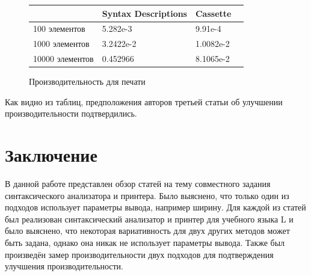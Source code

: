 \documentclass{matmex-diploma-custom}
\begin{document}
\begin{figure}[ht]
\centering
\begin{center}
    \begin{tabular}{ | p{4cm} | p{4cm} | p{3cm} | p{4cm} |}
    \hline
      & Syntax Descriptions &  Cassette \\ \hline
    100 элементов  & 5.282e-3 & 9.91e-4 \\ \hline
    1000 элементов & 3.2422e-2 & 1.0082e-2 \\ \hline
    10000 элементов & 0.452966 & 8.1065e-2 \\
    \hline
    \end{tabular}
\end{center}
\caption{Производительность для печати}
\end{figure}

Как видно из таблиц, предположения авторов третьей статьи об улучшении производительности подтвердились.

\section*{Заключение}
В данной работе представлен обзор статей на тему совместного задания синтаксического анализатора и принтера.
Было выяснено, что только один из подходов использует параметры вывода, например ширину. Для каждой из статей был реализован синтаксический анализатор и принтер для учебного языка L и было выяснено, что некоторая вариативность для двух других методов может быть задана, однако она никак не использует параметры вывода. Также был произведён замер производительности двух подходов для подтверждения улучшения производительности.




\end{document}
